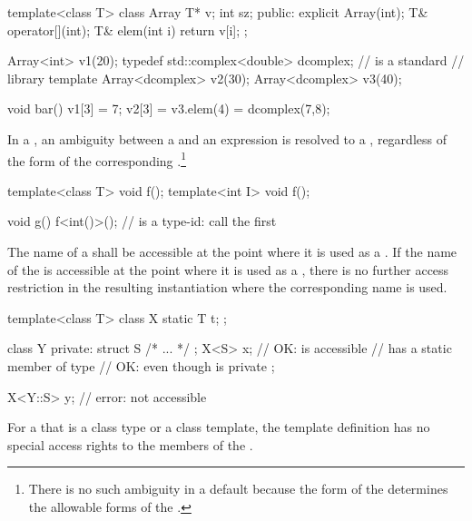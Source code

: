 \begin{codeblock}
template<class T> class Array {
  T* v;
  int sz;
public:
  explicit Array(int);
  T& operator[](int);
  T& elem(int i) { return v[i]; }
};

Array<int> v1(20);
typedef std::complex<double> dcomplex;  //  is a standard
                                        // library template
Array<dcomplex> v2(30);
Array<dcomplex> v3(40);

void bar() {
  v1[3] = 7;
  v2[3] = v3.elem(4) = dcomplex(7,8);
}
\end{codeblock}
\exitexample

\pnum
In a
,
an ambiguity between a
and an expression is resolved to a
,
regardless of the form of the corresponding
.\footnote{There is no such ambiguity in a default
because the form of the
determines the allowable forms of the
.}
\enterexample

\begin{codeblock}
template<class T> void f();
template<int I> void f();

void g() {
  f<int()>();       //  is a type-id: call the first 
}
\end{codeblock}
\exitexample

\pnum
The name of a
shall be accessible at the point where it is used as a
.
\enternote
If the name of the
is accessible at the point where it is used as a
,
there is no further access restriction in the resulting instantiation where the
corresponding
name is used.
\exitnote
\enterexample

\begin{codeblock}
template<class T> class X {
  static T t;
};

class Y {
private:
  struct S { /* ... */ };
  X<S> x;           // OK:  is accessible
                    //  has a static member of type 
                    // OK: even though  is private
};

X<Y::S> y;          // error:  not accessible
\end{codeblock}
\exitexample
For a
that is a class type or a class template, the template
definition has no special access rights to the
members of the . \enterexample

